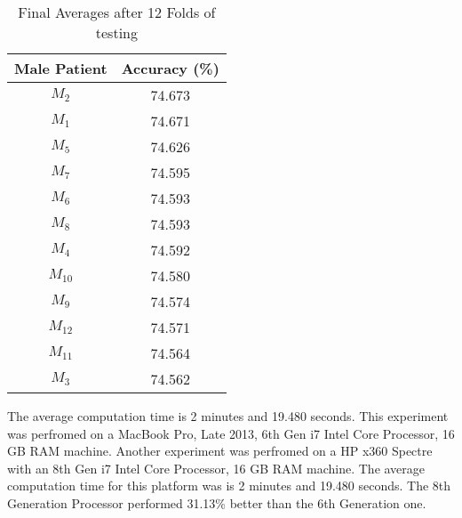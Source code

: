 \begin{table}[h!]
\centering
\begin{tabular}{||c c||} 
\hline
Male Patient & Accuracy (\%)  \\ [0.5ex] 
\hline \hline
$M_2$ & 74.673  \\ 
\hline
$M_1$ & 74.671  \\ 
\hline
$M_5$ & 74.626  \\ 
\hline
$M_7$ & 74.595  \\ 
\hline
$M_6$ & 74.593  \\ 
\hline
$M_8$ & 74.593  \\ 
\hline
$M_{4}$ & 74.592  \\ 
\hline
$M_{10}$ & 74.580  \\ 
\hline
$M_{9}$ & 74.574  \\ 
\hline
$M_{12}$ & 74.571\\ 
\hline 
$M_{11}$ & 74.564  \\ 
\hline
$M_{3}$ & 74.562  \\
\hline 
\hline
\end{tabular}
\caption{Final Averages after 12 Folds of testing}
\label{table:results}
\end{table}

The average computation time is 2 minutes and 19.480 seconds. This experiment was 
perfromed on a MacBook Pro, Late 2013, 6th Gen i7 Intel Core Processor, 16 GB 
RAM machine. Another experiment was perfromed on a HP x360 Spectre with an 8th Gen i7 Intel 
Core Processor, 16 GB RAM machine. The average computation time 
for this platform was is 2 minutes and 19.480 seconds. The 8th Generation 
Processor performed 31.13\% better than the 6th Generation one.
